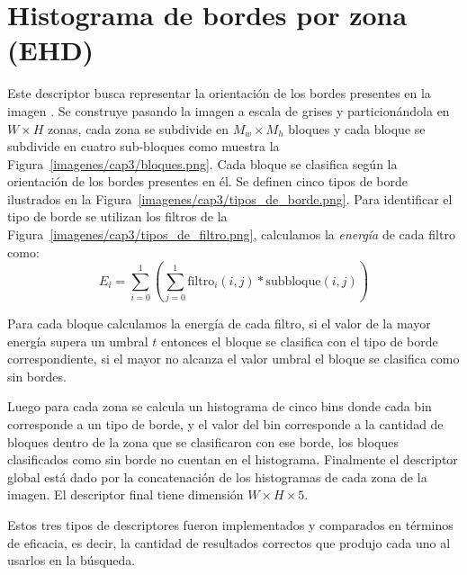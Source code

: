 \section{Histograma de bordes por zona (EHD)}
Este descriptor busca representar la orientación de los bordes presentes en la imagen \cite{Manjunath:ehd}. Se construye pasando la imagen a escala de grises y particionándola en $W \times H$ zonas, cada zona se subdivide en $M_w \times M_h$ bloques y cada bloque se subdivide en cuatro sub-bloques como muestra la Figura~\ref{imagenes/cap3/bloques.png}. 
Cada bloque se clasifica según la orientación de los bordes presentes en él. Se definen cinco tipos de borde ilustrados en la Figura~\ref{imagenes/cap3/tipos_de_borde.png}. Para identificar el tipo de borde se utilizan los filtros de la Figura~\ref{imagenes/cap3/tipos_de_filtro.png}, calculamos la \emph{energía} de cada filtro como: 
\begin{equation*}
E_i =  \displaystyle\sum_{i=0}^{1} \left(\displaystyle\sum_{j=0}^{1} \text{filtro}_i(i,j) * \text{subbloque}(i,j)\right)
\end{equation*}

Para cada bloque calculamos la energía de cada filtro, si el valor de la mayor energía supera un umbral $t$ entonces el bloque se clasifica con el tipo de borde correspondiente, si el mayor no alcanza el valor umbral el bloque se clasifica como sin bordes.

Luego para cada zona se calcula un histograma de cinco bins donde cada bin corresponde a un tipo de borde, y el valor del bin corresponde a la cantidad de bloques dentro de la zona que se clasificaron con ese borde, los bloques clasificados como sin borde no cuentan en el histograma.
Finalmente el descriptor global está dado por la concatenación de los histogramas de cada zona de la imagen. El descriptor final tiene dimensión 
$W \times H \times 5$.


Estos tres tipos de descriptores fueron implementados y comparados en términos de eficacia, es decir, la cantidad de resultados correctos que produjo cada uno al usarlos en la búsqueda. 
